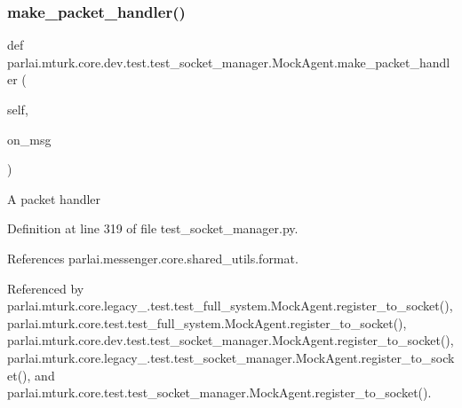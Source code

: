 \subsubsection{\texorpdfstring{make\+\_\+packet\+\_\+handler()}{make\_packet\_handler()}}
{\footnotesize\ttfamily def parlai.\+mturk.\+core.\+dev.\+test.\+test\+\_\+socket\+\_\+manager.\+Mock\+Agent.\+make\+\_\+packet\+\_\+handler (\begin{DoxyParamCaption}\item[{}]{self,  }\item[{}]{on\+\_\+msg }\end{DoxyParamCaption})}

\begin{DoxyVerb}A packet handler\end{DoxyVerb}
 

Definition at line 319 of file test\+\_\+socket\+\_\+manager.\+py.



References parlai.\+messenger.\+core.\+shared\+\_\+utils.\+format.



Referenced by parlai.\+mturk.\+core.\+legacy\+\_.\+test.\+test\+\_\+full\+\_\+system.\+Mock\+Agent.\+register\+\_\+to\+\_\+socket(), parlai.\+mturk.\+core.\+test.\+test\+\_\+full\+\_\+system.\+Mock\+Agent.\+register\+\_\+to\+\_\+socket(), parlai.\+mturk.\+core.\+dev.\+test.\+test\+\_\+socket\+\_\+manager.\+Mock\+Agent.\+register\+\_\+to\+\_\+socket(), parlai.\+mturk.\+core.\+legacy\+\_.\+test.\+test\+\_\+socket\+\_\+manager.\+Mock\+Agent.\+register\+\_\+to\+\_\+socket(), and parlai.\+mturk.\+core.\+test.\+test\+\_\+socket\+\_\+manager.\+Mock\+Agent.\+register\+\_\+to\+\_\+socket().

